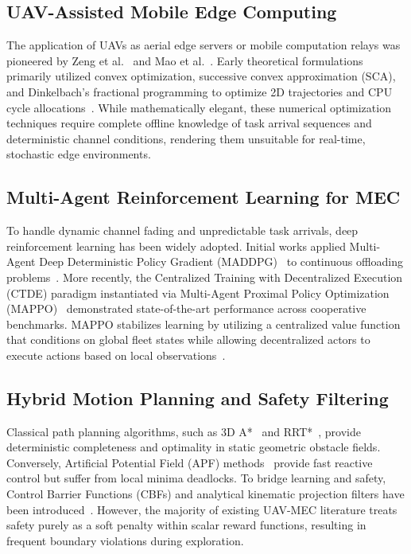 \documentclass[conference]{IEEEtran}
\begin{document}
\subsection{UAV-Assisted Mobile Edge Computing}
The application of UAVs as aerial edge servers or mobile computation relays was pioneered by Zeng et al.~\cite{zeng2017energy, zeng2019energy} and Mao et al.~\cite{mao2017survey}. Early theoretical formulations primarily utilized convex optimization, successive convex approximation (SCA), and Dinkelbach's fractional programming to optimize 2D trajectories and CPU cycle allocations~\cite{wang2020trajectory, yang2021uav}. While mathematically elegant, these numerical optimization techniques require complete offline knowledge of task arrival sequences and deterministic channel conditions, rendering them unsuitable for real-time, stochastic edge environments.

\subsection{Multi-Agent Reinforcement Learning for MEC}
To handle dynamic channel fading and unpredictable task arrivals, deep reinforcement learning has been widely adopted. Initial works applied Multi-Agent Deep Deterministic Policy Gradient (MADDPG)~\cite{lowe2017maddpg} to continuous offloading problems~\cite{dai2022joint}. More recently, the Centralized Training with Decentralized Execution (CTDE) paradigm instantiated via Multi-Agent Proximal Policy Optimization (MAPPO)~\cite{yu2022mappo} demonstrated state-of-the-art performance across cooperative benchmarks. MAPPO stabilizes learning by utilizing a centralized value function that conditions on global fleet states while allowing decentralized actors to execute actions based on local observations~\cite{schulman2017ppo, schulman2016gae}.

\subsection{Hybrid Motion Planning and Safety Filtering}
Classical path planning algorithms, such as 3D A*~\cite{hart1968astar} and RRT*~\cite{karaman2011rrtstar}, provide deterministic completeness and optimality in static geometric obstacle fields. Conversely, Artificial Potential Field (APF) methods~\cite{khatib1986apf} provide fast reactive control but suffer from local minima deadlocks. To bridge learning and safety, Control Barrier Functions (CBFs) and analytical kinematic projection filters have been introduced~\cite{ames2019cbf, deglurkar2021barrier}. However, the majority of existing UAV-MEC literature treats safety purely as a soft penalty within scalar reward functions, resulting in frequent boundary violations during exploration.
\end{document}
